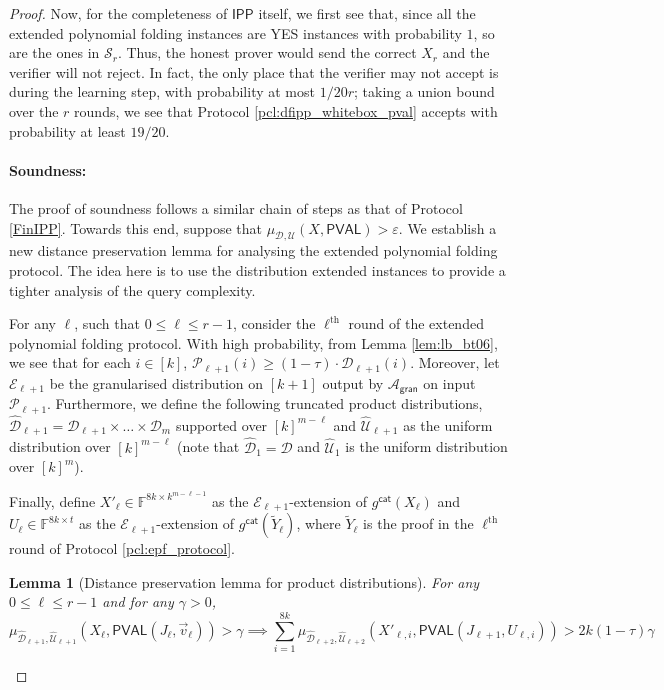 \documentclass[11pt]{article}
\newtheorem{lemma}[theorem]{Lemma}
\newcommand{\PVAL}{\mathsf{PVAL}}
\newcommand{\IPP}{\mathsf{IPP}}
\newcommand{\gran}{\mathsf{gran}}
\newcommand{\F}{\mathbb{F}}
\newcommand{\sU}{\mathcal{U}}
\newcommand{\sD}{\mathcal{D}}
\newcommand{\sA}{\mathcal{A}}
\newcommand{\sP}{\mathcal{P}}
\begin{document}
\begin{proof}
Now, for the completeness of $\IPP$ itself, we first see that, since all the extended polynomial folding instances are YES instances with probability $1$, so are the ones in $\mathcal{S}_r$. Thus, the honest prover would send the correct $X_r$ and the verifier will not reject. In fact, the only place that the verifier may not accept is during the learning step, with probability at most $1/20r$; taking a union bound over the $r$ rounds, we see that Protocol \ref{pcl:dfipp_whitebox_pval} accepts with probability at least $19/20$.

\paragraph*{Soundness:} The proof of soundness follows a similar chain of steps as that of Protocol \ref{FinIPP}. Towards this end, suppose that $\mu_{\sD,\sU}(X,\PVAL) > \varepsilon$. We establish a new distance preservation lemma for analysing the extended polynomial folding protocol. The idea here is to use the distribution extended instances to provide a tighter analysis of the query complexity. 

For any $\ell$, such that $0 \leq \ell \leq r-1$, consider the $\ell^{\text{th}}$ round of the extended polynomial folding protocol. With high probability, from Lemma \ref{lem:lb_bt06}, we see that for each $i \in [k]$, $\sP_{\ell+1}(i) \geq (1-\tau) \cdot \sD_{\ell+1}(i)$. Moreover, let $\mathcal{E}_{\ell+1}$ be the granularised distribution on $[k+1]$ output by $\sA_\gran$ on input $\sP_{\ell+1}$. Furthermore, we define the following truncated product distributions, $\widehat{\sD}_{\ell+1} = \sD_{\ell+1} \times \dots \times \sD_m$ supported over $[k]^{m-\ell}$ and $\widehat{\sU}_{\ell+1}$ as the uniform distribution over $[k]^{m-\ell}$ (note that $\widehat{\sD}_1 = \sD$ and $\widehat{\sU}_1$ is the uniform distribution over $[k]^m$). 

Finally, define $X'_\ell \in \F^{8k \times k^{m-\ell-1}}$ as the $\mathcal{E}_{\ell+1}$-extension of $g^\mathsf{cat}(X_\ell)$ and $U_\ell \in \F^{8k \times t}$ as the $\mathcal{E}_{\ell+1}$-extension of $g^\mathsf{cat}(\widetilde{Y}_{\ell})$, where $\widetilde{Y}_{\ell}$ is the proof in the $\ell^\text{th}$ round of Protocol \ref{pcl:epf_protocol}.

\begin{lemma}[Distance preservation lemma for product distributions]
    \label{lem:dpl_product}
    For any $0 \leq \ell \leq r-1$ and for any $\gamma > 0$,
    \begin{equation*}
        \mu_{\widehat{\sD}_{\ell+1},\widehat{\sU}_{\ell+1}} (X_\ell, \PVAL(J_\ell,\Vec{v}_\ell)) > \gamma \implies 
        \sum_{i=1}^{8k} \mu_{\widehat{\sD}_{\ell+2}, \widehat{\sU}_{\ell+2}} (X'_{\ell,i}, \PVAL(J_{\ell+1},U_{\ell,i})) > 2k(1-\tau)\gamma
    \end{equation*}
\end{lemma}


\end{proof}
\end{document}
